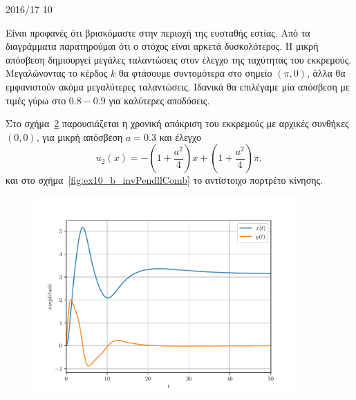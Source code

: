 \begin{solution}{2016/17 10}
\begin{figure}[h]
        \caption{}
        \label{fig:ex10_b_invPend4Comb}
    \end{figure}
    Είναι προφανές ότι βρισκόμαστε στην περιοχή της ευσταθής εστίας. Από τα
    διαγράμματα παρατηρούμαι ότι ο στόχος είναι αρκετά δυσκολότερος. Η μικρή
    απόσβεση δημιουργεί μεγάλες ταλαντώσεις στον έλεγχο της ταχύτητας του
    εκκρεμούς. Μεγαλώνοντας το κέρδος \( k \) θα φτάσουμε συντομότερα στο σημείο
    \( (\pi, 0) \), άλλα θα εμφανιστούν ακόμα μεγαλύτερες ταλαντώσεις. Ιδανικά
    θα επιλέγαμε μία απόσβεση με τιμές γύρω στο \( 0.8 - 0.9 \) για καλύτερες
    αποδόσεις.

    Στο σχήμα~\ref{fig:ex10_b_invPendll} παρουσιάζεται η χρονική απόκριση του
    εκκρεμούς με αρχικές συνθήκες \( (0, 0) \), για μικρή απόσβεση \( a = 0.3 \)
    και έλεγχο
    \[
        u_2(x) = -\left(1 + \frac{a^2}{4}\right)x +
        \left(1 + \frac{a^2}{4}\right)\pi,
    \]
    και στο σχήμα~\ref{fig:ex10_b_invPendllComb} το αντίστοιχο πορτρέτο κίνησης.
    \begin{figure}[h]
        \centering
        \includegraphics[width=0.9\textwidth]{figures/ex10_b_invPendll.pdf}
        \caption{}
        \label{fig:ex10_b_invPendll}
    \end{figure}
    \begin{figure}[h]
        \centering

\end{figure}
\end{solution}
